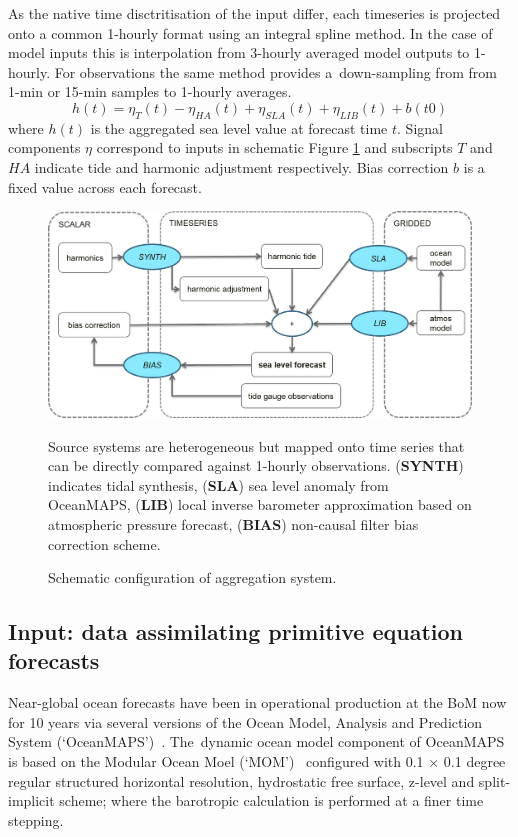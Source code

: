 As the native time disctritisation of the input differ, each timeseries is projected onto a common 1-hourly format using an integral spline method.  
In the case of model inputs this is interpolation from 3-hourly averaged model outputs to 1-hourly.  
For observations the same method provides a~down-sampling from from 1-min or 15-min samples to 1-hourly averages.  
\begin{equation}
h(t) = \eta_{T}(t) - \eta_{HA}(t) + \eta_{SLA}(t) + \eta_{LIB}(t) + b(t0)
\label{eq:aggSL}
\end{equation}
where $h(t)$ is the aggregated sea level value at forecast time $t$.  
Signal components $\eta$ correspond to inputs in schematic Figure \ref{fig:aggSL} and subscripts $T$ and $HA$ indicate tide and harmonic adjustment respectively.    
Bias correction $b$ is a fixed value across each forecast.
\begin{figure}[!hbt] \centering
\includegraphics[width=1.0\textwidth]{figures/diagrams/aggSL_schematic_abstract.png}
\caption{Schematic configuration of aggregation system.}
{Source systems are heterogeneous but mapped onto time series that can be directly compared against 1-hourly observations.  (\textbf{SYNTH}) indicates tidal synthesis, (\textbf{SLA}) sea level anomaly from OceanMAPS, (\textbf{LIB}) local inverse barometer approximation based on atmospheric pressure forecast, (\textbf{BIAS}) non-causal filter bias correction scheme. }
\label{fig:aggSL}
\end{figure}   


\subsection{Input: data assimilating primitive equation forecasts }
\label{sec:dynamicmodels}

Near-global ocean forecasts have been in operational production at the BoM now for 10 years via several versions of the Ocean Model, Analysis and Prediction System (`OceanMAPS')~\citep{Brassington:2007ut,NMOC:2007wq,BureauofMeterology:2011ta,Brassington:2012wm}.
The~dynamic ocean model component of OceanMAPS is based on the Modular Ocean Moel (`MOM')~\citep{Griffies:2008vh} configured with 0.1 $\times$ 0.1 degree regular structured horizontal resolution, hydrostatic free surface, z-level and split-implicit scheme; where the barotropic calculation is performed at a finer time stepping. 


